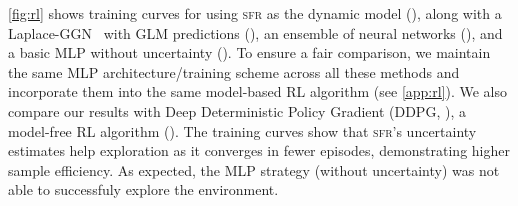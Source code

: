 \documentclass{article} %
\newcommand{\our}{\textsc{sfr}\xspace}
\begin{document}

\cref{fig:rl} shows training curves for using \our as the dynamic model (), along with a Laplace-GGN~\cite{immer2021scalable} with GLM predictions (), an ensemble of neural networks (), and a basic MLP without uncertainty (). To ensure a fair comparison, we maintain the same MLP architecture/training scheme across all these methods and incorporate them into the same model-based RL algorithm (see \cref{app:rl}). We also compare our results with Deep Deterministic Policy Gradient (DDPG, \cite{lillicrapContinuousControlDeep2016}), a model-free RL algorithm ().
The training curves show that \our's uncertainty estimates help exploration as it converges in fewer episodes, demonstrating higher sample efficiency.
As expected, the MLP strategy (without uncertainty) was not able to successfuly explore the environment.






\end{document}
